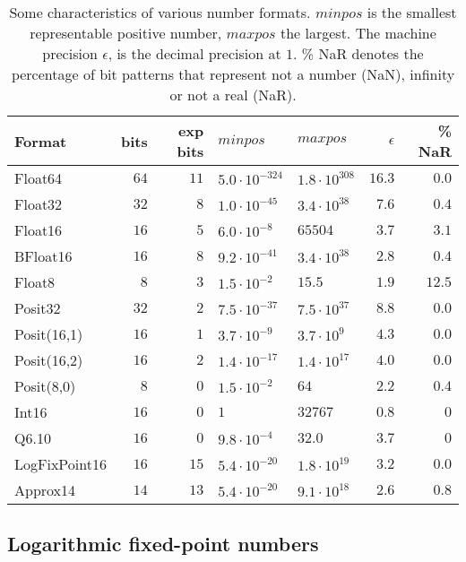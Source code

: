 \begin{table}[htbp]
\center
\begin{tabular}{l | r | r | l | l | r | r}
Format & bits & exp bits & $minpos$ & $maxpos$ & $\epsilon$ &  \% NaR \\
\hline
Float64    & $64$ & $11$ & $5.0 \cdot 10^{-324}$ & $1.8 \cdot 10^{308}$  & $16.3$ & $0.0$ \\
Float32    & $32$ & $8$ & $1.0 \cdot 10^{-45}$ & $3.4 \cdot 10^{38}$ & $7.6$ & $0.4$ \\
Float16    & $16$ & $5$ & $6.0 \cdot 10^{-8}$ & $65504$ & $3.7$ & $3.1$ \\
BFloat16    & $16$ & $8$ & $ 9.2 \cdot 10^{-41}$ & $3.4 \cdot 10^{38}$ & $2.8$ & $0.4$  \\
Float8 & $8$ & $3$ & $1.5 \cdot 10^{-2}$ & $15.5$ & $1.9$ & $12.5$\\
\hline
Posit32    & $32$ & $2$ &  $7.5 \cdot 10^{-37}$ & $7.5 \cdot 10^{37}$ & $8.8$ & $0.0$ \\
Posit(16,1) & $16$ & $1$ & $3.7 \cdot 10^{-9}$ & $3.7 \cdot 10^{9}$ & $4.3$ & $0.0$\\
Posit(16,2) & $16$ & $2$ & $1.4 \cdot 10^{-17}$ & $1.4 \cdot 10^{17}$ & $4.0$ & $0.0$\\
Posit(8,0) & $8$ & $0$ & $1.5 \cdot 10^{-2}$ & $64$ & $2.2$ & $0.4$  \\
\hline
Int16 & $16$ & $0$ & $1$ & $32767$ & $0.8$ & $0$\\
Q6.10 & $16$ & $0$ & $9.8 \cdot 10^{-4}$ & $32.0$ & $3.7$ & $0$\\
\hline
LogFixPoint16 & $16$ & $15$ & $5.4 \cdot 10^{-20}$ & $1.8 \cdot 10^{19}$ & $3.2$ & $0.0$\\
Approx14 & $14$ & $13$ & $5.4 \cdot 10^{-20}$ & $9.1 \cdot 10^{18}$ & $2.6$ & $0.8$
\end{tabular}
\vspace{10pt}
\caption{Some characteristics of various number formats. $minpos$ is the smallest representable positive number,
$maxpos$ the largest. The machine precision $\epsilon$, is the decimal precision at $1$. \% NaR denotes the
percentage of bit patterns that represent not a number (NaN), infinity or not a real (NaR).}
\label{tab:formats}
\end{table}

	\subsection{Logarithmic fixed-point numbers}
	\label{sec:logfixs}


